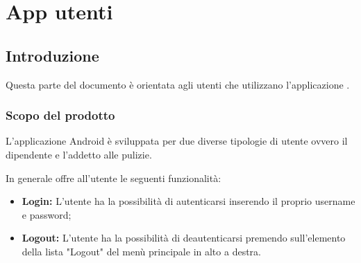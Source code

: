 \section{App utenti}
\subsection{Introduzione}
Questa parte del documento è orientata agli utenti che utilizzano l'applicazione .

\subsubsection{Scopo del prodotto}
L'applicazione Android è sviluppata per due diverse tipologie di utente ovvero il dipendente e l'addetto alle pulizie.

In generale offre all'utente le seguenti funzionalità:
\begin{itemize}
	\item \textbf{Login:} L'utente ha la possibilità di autenticarsi inserendo il proprio username e password; \\
	\item \textbf{Logout:} L'utente ha la possibilità di deautenticarsi premendo sull'elemento della lista "Logout" del menù principale in alto a destra. \\
\end{itemize}


